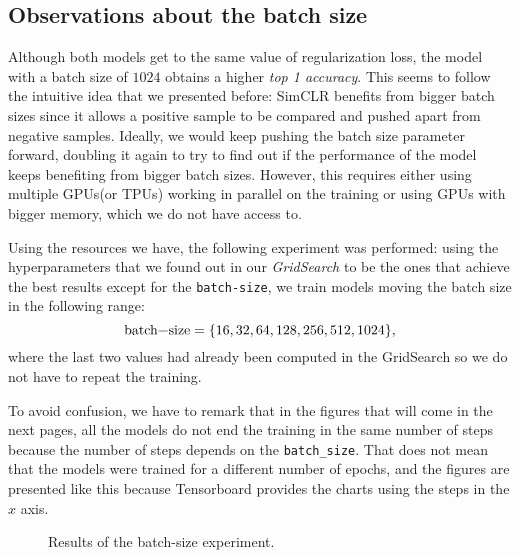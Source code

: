 \subsection*{Observations about the batch size}

Although both models get to the same value of regularization loss, the model with a batch size of $1024$ obtains a higher \emph{top 1 accuracy}. This seems to follow the intuitive idea that we presented before: SimCLR benefits from bigger batch sizes since it allows a positive sample to be compared and pushed apart from negative samples. Ideally, we would keep pushing the batch size parameter forward, doubling it again to try to find out if the performance of the model keeps benefiting from bigger batch sizes. However, this requires either using multiple GPUs(or TPUs) working in parallel on the training or using GPUs with bigger memory, which we do not have access to. 

Using the resources we have, the following experiment was performed: using the hyperparameters that we found out in our \emph{GridSearch} to be the ones that achieve the best results except for the \lstinline{batch-size}, we train models moving the batch size in the following range: 
$$
\text{\lstinline{batch-size}}=\{16,32,64,128,256,512,1024\},
$$
where the last two values had already been computed in the GridSearch so we do not have to repeat the training. 

\begin{remark}
    To avoid confusion, we have to remark that in the figures that will come in the next pages, all the models do not end the training in the same number of steps because the number of steps depends on the \lstinline{batch_size}. That does not mean that the models were trained for a different number of epochs, and the figures are presented like this because Tensorboard provides the charts using the steps in the $x$ axis. 
\end{remark}

\begin{figure}[htp] 
    \centering
    \hfill%
        \caption{Results of the batch-size experiment.}
\end{figure}

